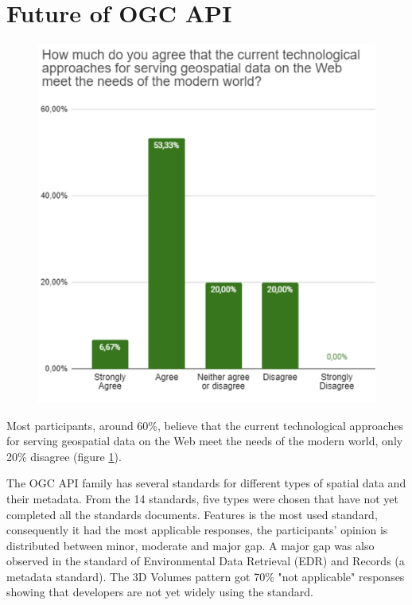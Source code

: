 \section{Future of OGC API}


\begin{figure}[H]
     \centering
     \includegraphics[scale=0.8]{img/modern.png}
     \caption{}
     \label{fig:modern}
\end{figure}

Most participants, around 60\%, believe that the current technological approaches for serving geospatial data on the Web meet the needs of the modern world, only 20\% disagree (figure \ref{fig:modern}).

The OGC API family has several standards for different types of spatial data and their metadata. From the 14 standards, five types were chosen that have not yet completed all the standards documents. Features is the most used standard, consequently it had the most applicable responses, the participants' opinion is distributed between minor, moderate and major gap. A major gap was also observed in the standard of Environmental Data Retrieval (EDR) and Records (a metadata standard). The 3D Volumes pattern got 70\% "not applicable" responses showing that developers are not yet widely using the standard.



